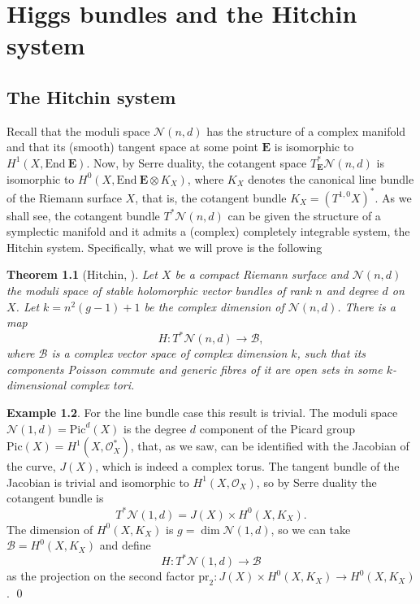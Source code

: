 \documentclass[12pt,a4paper]{book}
\newtheorem{thm}{Theorem}[section]
\theoremstyle{definition} \newtheorem{defn}[thm]{Definition}
\theoremstyle{definition} \newtheorem{ejemplo}[thm]{Example}
\theoremstyle{remark} \newtheorem{rem}[thm]{Remark}
\def\pr{\mathrm{pr}}
\def\OO{\mathscr{O}}
\def\BB{\mathscr{B}}
\def\End{\mathrm{End}}
\def\Bun{\mathscr{N}}
\def\Pic{\mathrm{Pic}}
\newcommand{\ve}[1]{\mathbf{#1}}
\begin{document}
\chapter{Higgs bundles and the Hitchin system}
\section{The Hitchin system}
Recall that the moduli space $\Bun(n,d)$ has the structure of a complex manifold and that its (smooth) tangent space at some point $\ve{E}$ is isomorphic to $H^1(X,\End\ \ve{E})$. Now, by Serre duality, the cotangent space $T_{\ve{E}}^*\Bun(n,d)$ is isomorphic to $H^0(X,\End\ \ve{E} \otimes K_X)$, where $K_X$ denotes the canonical line bundle of the Riemann surface $X$, that is, the cotangent bundle $K_X=(T^{1,0}X)^*$. As we shall see, the cotangent bundle $T^*\Bun(n,d)$ can be given the structure of a symplectic manifold and it admits a (complex) completely integrable system, the Hitchin system. Specifically, what we will prove is the following
\begin{thm}[Hitchin, \cite{hitchinsystem}] \label{hitchinsystem}
  Let $X$ be a compact Riemann surface and $\Bun(n,d)$ the moduli space of stable holomorphic vector bundles of rank $n$ and degree $d$ on $X$. Let $k=n^2(g-1)+1$ be the complex dimension of $\Bun(n,d)$. There is a map
  \begin{equation*}
    H: T^*\Bun(n,d) \rightarrow \BB,
  \end{equation*}
  where $\BB$ is a complex vector space of complex dimension $k$, such that its components Poisson commute and generic fibres of it are open sets in some $k$-dimensional complex tori.
\end{thm}

\begin{ejemplo}
  For the line bundle case this result is trivial. The moduli space $\Bun(1,d)=\Pic^d(X)$ is the degree $d$ component of the Picard group $\Pic(X)=H^1(X,\OO_X^*)$, that, as we saw, can be identified with the Jacobian of the curve, $J(X)$, which is indeed a complex torus. The tangent bundle of the Jacobian is trivial and isomorphic to $H^1(X,\OO_X)$, so by Serre duality the cotangent bundle is 
  \begin{equation*}
    T^*\Bun(1,d) = J(X)\times H^0(X,K_X).
  \end{equation*}
  The dimension of $H^0(X,K_X)$ is $g=\dim \Bun(1,d)$, so we can take $\BB=H^0(X,K_X)$ and define
  \begin{equation*}
    H:T^*\Bun(1,d) \rightarrow \BB
  \end{equation*}
  as the projection on the second factor $\pr_2:J(X)\times H^0(X,K_X) \rightarrow H^0(X,K_X)$. \qed
\end{ejemplo}
  
\end{document}
